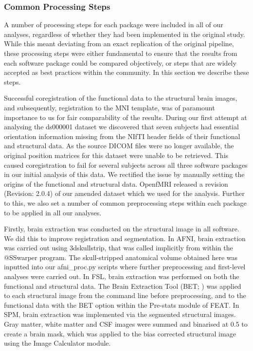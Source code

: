 \subsubsection{Common Processing Steps}
A number of processing steps for each package were included in all of our analyses, regardless of whether they had been implemented in the original study. While this meant deviating from an exact replication of the original pipeline, these processing steps were either fundamental to ensure that the results from each software package could be compared objectively, or steps that are widely accepted as best practices within the community. In this section we describe these steps.

Successful coregistration of the functional data to the structural brain images, and subsequently, registration to the MNI template, was of paramount importance to us for fair comparability of the results. During our first attempt at analysing the ds000001 dataset we discovered that seven subjects had essential orientation information missing from the NIfTI header fields of their functional and structural data. As the source DICOM files were no longer available, the original position matrices for this dataset were unable to be retrieved. This caused coregistration to fail for several subjects across all three software packages in our initial analysis of this data. We rectified the issue by manually setting the origins of the functional and structural data. OpenfMRI released a revision (Revision: 2.0.4) of our amended dataset which we used for the analysis. Further to this, we also set a number of common preprocessing steps within each package to be applied in all our analyses.   

Firstly, brain extraction was conducted on the structural image in all software. We did this to improve registration and segmentation. In AFNI, brain extraction was carried out using 3dskullstrip, that was called implicitly from within the @SSwarper program. The skull-stripped anatomical volume obtained here was inputted into our afni\_proc.py scripts where further preprocessing and first-level analyses were carried out.  In FSL, brain extraction was performed on both the functional and structural data. The Brain Extraction Tool (BET; \citep{Smith2002-vw}) was applied to each structural image from the command line before preprocessing, and to the functional data with the BET option within the Pre-stats module of FEAT. In SPM, brain extraction was implemented via the segmented structural images. Gray matter, white matter and CSF images were summed and binarised at 0.5 to create a brain mask, which was applied to the bias corrected structural image using the Image Calculator module. 

